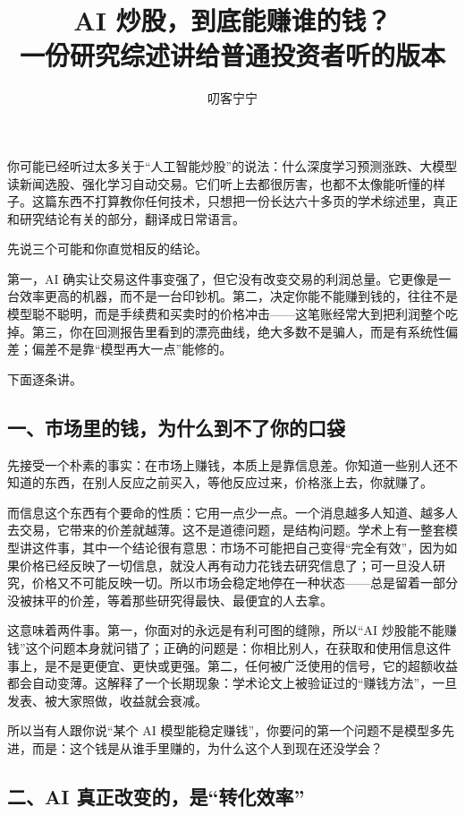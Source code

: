 \documentclass[11pt,a4paper]{ctexart}
\title{\bfseries AI 炒股，到底能赚谁的钱？\\\large 一份研究综述讲给普通投资者听的版本}
\author{\large 叨客宁宁}
\date{}
\begin{document}
\maketitle

\noindent 你可能已经听过太多关于“人工智能炒股”的说法：什么深度学习预测涨跌、大模型读新闻选股、强化学习自动交易。它们听上去都很厉害，也都不太像能听懂的样子。这篇东西不打算教你任何技术，只想把一份长达六十多页的学术综述里，真正和研究结论有关的部分，翻译成日常语言。

先说三个可能和你直觉相反的结论。

第一，AI 确实让交易这件事变强了，但它没有改变交易的利润总量。它更像是一台效率更高的机器，而不是一台印钞机。第二，决定你能不能赚到钱的，往往不是模型聪不聪明，而是手续费和买卖时的价格冲击——这笔账经常大到把利润整个吃掉。第三，你在回测报告里看到的漂亮曲线，绝大多数不是骗人，而是有系统性偏差；偏差不是靠“模型再大一点”能修的。

下面逐条讲。

\subsection*{一、市场里的钱，为什么到不了你的口袋}

先接受一个朴素的事实：在市场上赚钱，本质上是靠信息差。你知道一些别人还不知道的东西，在别人反应之前买入，等他反应过来，价格涨上去，你就赚了。

而信息这个东西有个要命的性质：它用一点少一点。一个消息越多人知道、越多人去交易，它带来的价差就越薄。这不是道德问题，是结构问题。学术上有一整套模型讲这件事，其中一个结论很有意思：市场不可能把自己变得“完全有效”，因为如果价格已经反映了一切信息，就没人再有动力花钱去研究信息了；可一旦没人研究，价格又不可能反映一切。所以市场会稳定地停在一种状态——总是留着一部分没被抹平的价差，等着那些研究得最快、最便宜的人去拿。

这意味着两件事。第一，你面对的永远是有利可图的缝隙，所以“AI 炒股能不能赚钱”这个问题本身就问错了；正确的问题是：你相比别人，在获取和使用信息这件事上，是不是更便宜、更快或更强。第二，任何被广泛使用的信号，它的超额收益都会自动变薄。这解释了一个长期现象：学术论文上被验证过的“赚钱方法”，一旦发表、被大家照做，收益就会衰减。

所以当有人跟你说“某个 AI 模型能稳定赚钱”，你要问的第一个问题不是模型多先进，而是：这个钱是从谁手里赚的，为什么这个人到现在还没学会？

\subsection*{二、AI 真正改变的，是“转化效率”}
\end{document}
